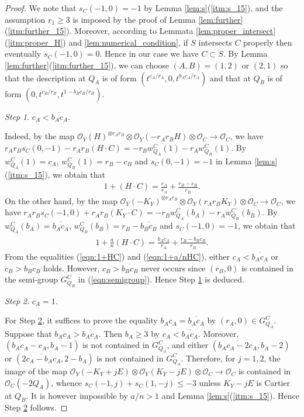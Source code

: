 \documentclass[a4paper,11pt]{amsart}
\theoremstyle{definition}
\theoremstyle{remark}
\newtheorem{step}{Step}
\numberwithin{equation}{section}
\newcommand{\cO}{{\mathcal O}}
\begin{document}
\begin{proof}
We note that $s_C(-1,0)=-1$ by Lemma \ref{lem:s}(\ref{itm:s_15}),
and the assumption $r_1\ge3$ is imposed
by the proof of Lemma \ref{lem:further}(\ref{itm:further_15}).
Moreover,
according to Lemmata \ref{lem:proper_intersect}(\ref{itm:proper_H})
and \ref{lem:numerical_condition},
if $S$ intersects $C$ properly then eventually $s_C(-1,0)=0$.
Hence in our case we have $C \subset S$.
By Lemma \ref{lem:further}(\ref{itm:further_15}),
we can choose $(A, B)=(1, 2)$ or $(2, 1)$ so that
the description at $Q_A$ is of form
$(t^{c_A/r_A},0,t^{\overline{b_Ac_A}/r_A})$
and that at $Q_B$ is of form $(0,t^{c_B/r_B},t^{1-\overline{b_Bc_B}/r_B})$.

\begin{step}\label{stp:true/false-1}
\itshape
$c_A < \overline{b_Ac_A}$.
\end{step}

Indeed,
by the map
$\cO_Y(H)^{\otimes r_Ar_B} \otimes \cO_Y(-r_Ar_BH) \otimes \cO_C \to \cO_C$,
we have $r_Ar_Bs_C(0,-1)-r_Ar_B(H \cdot C)=-r_Bw_{Q_A}^C(1)-r_Aw_{Q_B}^C(1)$.
By $w_{Q_A}^C(1)=c_A$, $w_{Q_B}^C(1)=r_B-c_B$ and
$s_C(0,-1)=-1$ in Lemma \ref{lem:s}(\ref{itm:s_15}),
we obtain that
\begin{align}\label{eqn:1+HC}
1+(H \cdot C)=\frac{c_A}{r_A}+\frac{r_B-c_B}{r_B}.
\end{align}
On the other hand,
by the map
$\cO_Y(-K_Y)^{\otimes r_Ar_B} \otimes \cO_Y(r_Ar_BK_Y) \otimes \cO_C
\to \cO_C$,
we have
$r_Ar_Bs_C(-1,0)+r_Ar_B(K_Y \cdot C)=-r_Bw_{Q_A}^C(b_A)-r_Aw_{Q_B}^C(b_B)$.
By $w_{Q_A}^C(b_A)=\overline{b_Ac_A}$, $w_{Q_B}^C(b_B)=r_B-\overline{b_Bc_B}$
and $s_C(-1,0)=-1$,
we obtain that
\begin{align}\label{eqn:1+a/nHC}
1+\frac{a}{n}(H \cdot C)=
\frac{\overline{b_Ac_A}}{r_A}+\frac{r_B-\overline{b_Bc_B}}{r_B}.
\end{align}
From the equalities (\ref{eqn:1+HC}) and (\ref{eqn:1+a/nHC}),
either $c_A < \overline{b_Ac_A}$ or $c_B > \overline{b_Bc_B}$ holds.
However, $c_B > \overline{b_Bc_B}$ never occurs since
$(r_B, 0)$ is contained in the semi-group $G_{Q_B}^C$ in (\ref{eqn:semigroup}).
Hence Step \ref{stp:true/false-1} is deduced.

\begin{step}\label{stp:true/false-2}
\itshape
$c_A=1$.
\end{step}

For Step \ref{stp:true/false-2},
it suffices to prove the equality $b_Ac_A=\overline{b_Ac_A}$
by $(r_A,0)\in G_{Q_A}^C$.
Suppose that $b_Ac_A>\overline{b_Ac_A}$.
Then $b_A \ge 3$ by $c_A<\overline{b_Ac_A}$.
Moreover,
$(\overline{b_Ac_A}-c_A, b_A-1)$ is not contained in $G_{Q_A}^C$,
and either $(\overline{b_Ac_A-2c_A}, b_A-2)$
or $(\overline{2c_A-b_Ac_A}, 2-b_A)$ is not contained in $G_{Q_A}^C$.
Therefore, for $j=1,2$,
the image of the map
$\cO_Y(-K_Y+jE) \otimes \cO_Y(K_Y-jE) \otimes \cO_C \to \cO_C$
is contained in $\cO_C(-2Q_A)$,
whence $s_C(-1,j)+s_C(1,-j)\le-3$ unless $K_Y-jE$ is Cartier at $Q_B$.
It is however impossible by $a/n>1$ and Lemma \ref{lem:s}(\ref{itm:s_15}).
Hence Step \ref{stp:true/false-2} follows.


\end{proof}
\end{document}
